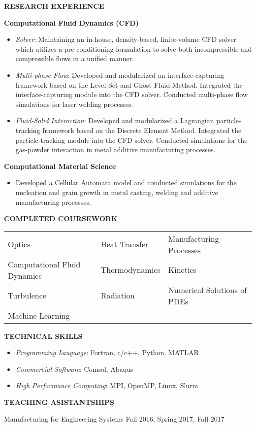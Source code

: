 \documentclass[11pt, letterpaper]{article}
\begin{document}
\vspace{-3pt}
\paraspace
\textbf{RESEARCH EXPERIENCE}

\fullrule
\textbf{Computational Fluid Dynamics (CFD)}
\begin{itemize}[leftmargin=*, labelsep=5mm]
   \item \textit{Solver}: Maintaining an in-house, density-based, finite-volume CFD solver which utilizes a pre-conditioning formulation to solve both incompressible and compressible flows in a unified manner. 
   \item \textit{Multi-phase Flow}: Developed and modularized an interface-capturing framework based on the Level-Set and Ghost Fluid Method. Integrated the interface-capturing module into the CFD solver. Conducted multi-phase flow simulations for laser welding processes.
   \item \textit{Fluid-Solid Interaction}: Developed and modularized a Lagrangian particle-tracking framework based on the Discrete Element Method. Integrated the particle-tracking module into the CFD solver. Conducted simulations for the gas-powder interaction in metal additive manufacturing processes.
\end{itemize}

\vspace{3pt}
\textbf{Computational Material Science}
\begin{itemize}[leftmargin=*, labelsep=5mm]
   \item Developed a Cellular Automata model and conducted simulations for the nucleation and grain growth in metal casting, welding and additive manufacturing processes.
\end{itemize}
\vspace{-3pt}
\paraspace
\textbf{COMPLETED COURSEWORK}

\fullrule
\vspace{3pt}
\begin{tabular}{@{} p{} p{} p{} @{}}
   Optics & Heat Transfer & Manufacturing Processes \\
   Computational Fluid Dynamics & Thermodynamics & Kinetics \\
   Turbulence & Radiation & Numerical Solutions of PDEs \\
   Machine Learning & & 
\end{tabular}

\paraspace
\textbf{TECHNICAL SKILLS}

\fullrule

\begin{itemize}[leftmargin=*, labelsep=3mm, itemsep=2pt, topsep=0pt]
   \item \textit{Programming Language}: Fortran, c/c++, Python, MATLAB
   \item \textit{Commercial Software}: Comsol, Abaqus
   \item \textit{High Performance Computing}: MPI, OpenMP, Linux, Slurm
\end{itemize}

\paraspace
\textbf{TEACHING ASISTANTSHIPS}

\fullrule
Manufacturing for Engineering Systems \hfill Fall 2016, Spring 2017, Fall 2017
\end{document}
